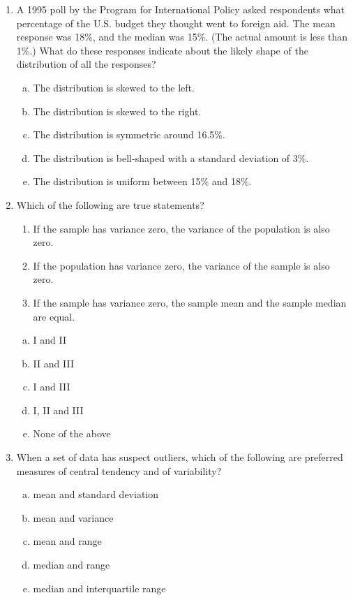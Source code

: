 \documentclass[a4paper,12pt,twoside]{book}
\begin{document}
\begin{itemize}
\begin{enumerate}
     \item A 1995 poll by the Program for International Policy asked respondents what percentage of the U.S. budget they thought went to foreign aid. The mean response was 18\%, and the median was 15\%. (The actual amount is less than 1\%.) What do these responses indicate about the likely shape of the distribution of all the responses?
     
     \begin{enumerate}[(a)]
       \item The distribution is skewed to the left.
       \item The distribution is skewed to the right.
       \item The distribution is symmetric around 16.5\%.
       \item  The distribution is bell-shaped with a standard deviation of 3\%.
       \item The distribution is uniform between 15\% and 18\%.
     \end{enumerate}
     \vspace{0.3cm}
     
    \item Which of the following are true statements?
      \begin{enumerate}[\Roman*. , start =1]
        \item If the sample has variance zero, the variance of the population is also zero.
        \item If the population has variance zero, the variance of the sample is also zero.
        \item If the sample has variance zero, the sample mean and the sample median are equal.
      \end{enumerate}
      
        \begin{enumerate}[(a)]
           \item I and II
           \item II and III
           \item I and III
           \item I, II and III
           \item None of the above
        \end{enumerate}
        \vspace{0.3cm}
        
        \item When a set of data has suspect outliers, which of the following are preferred measures of central tendency and of variability?
        \begin{enumerate}[(a)]
          \item mean and standard deviation
          \item mean and variance
          \item mean and range
          \item median and range
          \item median and interquartile range
        \end{enumerate}
        \vspace{0.3cm}
        

\end{enumerate}
\end{itemize}
\end{document}
